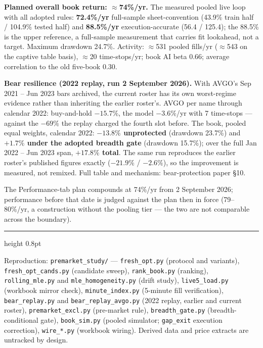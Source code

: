 \documentclass[11pt,a4paper]{article}
\begin{document}
\textbf{Planned overall book return: $\approx$74\%/yr.} The measured
pooled live loop with all adopted rules: \textbf{72.4\%/yr} full-sample
sheet-convention (43.9\% train half / 104.9\% tested half) and
\textbf{88.5\%/yr} execution-accurate (56.4 / 125.4); the 88.5\% is the
upper reference, a full-sample measurement that carries fit lookahead, not a
target. Maximum drawdown 24.7\%. Activity: $\approx$531 pooled fills/yr
($\approx$543 on the captive table basis), $\approx$20 time-stops/yr; book
AI beta 0.66; average correlation to the old five-book 0.30.

\textbf{Bear resilience (2022 replay, run 2 September 2026).} With AVGO's
Sep 2021 -- Jun 2023 bars archived, the current roster has its own
worst-regime evidence rather than inheriting the earlier roster's. AVGO per
name through calendar 2022: buy-and-hold $-15.7\%$, the model $-3.6\%$/yr
with 7 time-stops --- against the $-69\%$ the replay charged the fourth slot
before. The book, pooled equal weights, calendar 2022: \textbf{$-13.8\%$
unprotected} (drawdown 23.7\%) and \textbf{$+1.7\%$ under the adopted breadth
gate} (drawdown 15.7\%); over the full Jan 2022 -- Jun 2023 span,
\textbf{$+17.8\%$ total}. The same run reproduces the earlier roster's
published figures exactly ($-21.9\%$ / $-2.6\%$), so the improvement is
measured, not remixed. Full table and mechanism: bear-protection paper \S10.

The Performance-tab plan compounds at 74\%/yr from 2 September 2026;
performance before that date is judged against the plan then in force
(79--80\%/yr, a construction without the pooling tier --- the two are not
comparable across the boundary).

\vspace{0.5cm}
{\color{bcnavy}\hrule height 0.8pt}
\vspace{0.2cm}
{\footnotesize\color{bcgrey} Reproduction: \texttt{premarket\_study/} ---
\texttt{fresh\_opt.py} (protocol and variants), \texttt{fresh\_opt\_cands.py}
(candidate sweep), \texttt{rank\_book.py} (ranking), \texttt{rolling\_mle.py} and
\texttt{mle\_homogeneity.py} (drift study), \texttt{live5\_load.py} (workbook
mirror check), \texttt{minute\_index.py} (5-minute fill verification),
\texttt{bear\_replay.py} and \texttt{bear\_replay\_avgo.py} (2022 replay,
earlier and current roster), \texttt{premarket\_excl.py} (pre-market
rule), \texttt{breadth\_gate.py} (breadth-conditional gate),
\texttt{book\_sim.py} (pooled simulator; \texttt{gap\_exit} execution
correction), \texttt{wire\_*.py} (workbook wiring). Derived data and price
extracts are untracked by design.}
\end{document}
